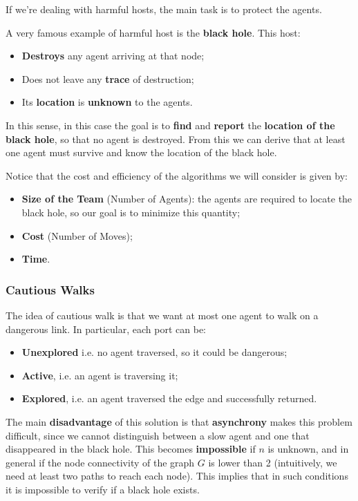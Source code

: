 If we're dealing with harmful hosts, the main task is to protect the agents. 

A very famous example of harmful host is the \textbf{black hole}. This host:
\begin{itemize}
    \item \textbf{Destroys} any agent arriving at that node;
    \item Does not leave any \textbf{trace} of destruction;
    \item Its \textbf{location} is \textbf{unknown} to the agents.
\end{itemize}

In this sense, in this case the goal is to \textbf{find} and \textbf{report} the \textbf{location of the black hole}, so that no agent is destroyed. From this we can derive that at least one agent must survive and know the location of the black hole.

Notice that the cost and efficiency of the algorithms we will consider is given by:
\begin{itemize}
    \item \textbf{Size of the Team} (Number of Agents): the agents are required to locate the black hole, so our goal is to minimize this quantity;
    \item \textbf{Cost} (Number of Moves);
    \item \textbf{Time}.
\end{itemize}

\subsubsection{Cautious Walks}
The idea of cautious walk is that we want at most one agent to walk on a dangerous link. In particular, each port can be:
\begin{itemize}
    \item \textbf{Unexplored} i.e. no agent traversed, so it could be dangerous;
    \item \textbf{Active}, i.e. an agent is traversing it;
    \item \textbf{Explored}, i.e. an agent traversed the edge and successfully returned.
\end{itemize}

The main \textbf{disadvantage} of this solution is that \textbf{asynchrony} makes this problem difficult, since we cannot distinguish between a slow agent and one that disappeared in the black hole. This becomes \textbf{impossible} if $n$ is unknown, and in general if the node connectivity of the graph $G$ is lower than 2 (intuitively, we need at least two paths to reach each node). This implies that in such conditions it is impossible to verify if a black hole exists.

